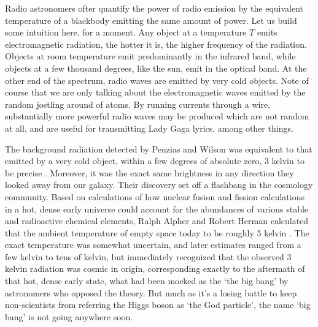 Radio astronomers ofter quantify the power of radio emission by the equivalent temperature of a blackbody emitting the same amount of power. Let us build some intuition here, for a moment. Any object at a temperature $T$ emits electromagnetic radiation, the hotter it is, the higher frequency of the radiation. Objects at room temperature emit predominantly in the infrared band, while objects at a few thousand degrees, like the sun, emit in the optical band. At the other end of the spectrum, radio waves are emitted by very cold objects. Note of course that we are only talking about the  electromagnetic waves emitted by the random jostling around of atoms. By running currents through a wire, substantially more powerful radio waves may be produced which are not random at all, and are useful for transmitting Lady Gaga lyrics, among other things.

The background radiation detected by Penzias and Wilson was equivalent to that emitted by a very cold object, within a few degrees of absolute zero, 3 kelvin to be precise \citep{penzias65}. Moreover, it was the exact same brightness in any direction they looked away from our galaxy. Their discovery set off a flashbang in the cosmology community. Based on calculations of how nuclear fusion and fission calculations in a hot, dense early universe could account for the abundances of various stable and radioactive chemical elements, Ralph Alpher and Robert Herman calculated that the ambient temperature of empty space today to be roughly 5 kelvin \citep{alpher48,alpherherman,gamow48}.  The exact temperature was somewhat uncertain, and later estimates ranged from a few kelvin to tens of kelvin, but \citep{dicke65} immediately recognized that the observed 3 kelvin radiation was cosmic in origin, corresponding exactly to the aftermath of that hot, dense early state, what had been mocked as the `the big bang' by astronomers who opposed the theory. But much as it's a losing battle to keep non-scientists from referring the Higgs boson as `the God particle', the name `big bang' is not going anywhere soon. 

